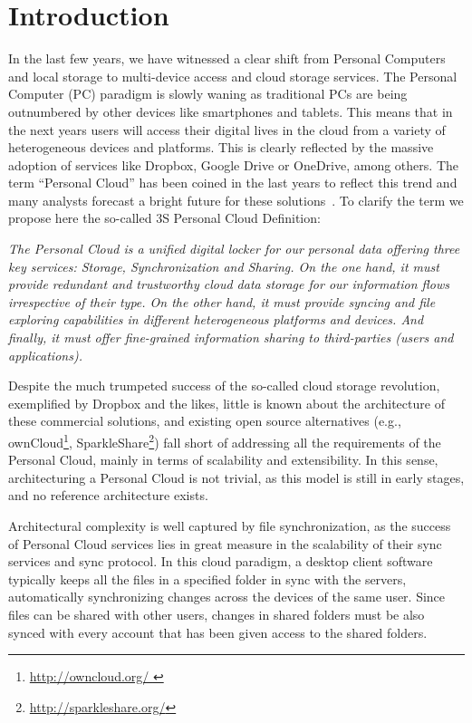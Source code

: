 \chapter{Introduction}

In the last few years, we have witnessed a clear shift from Personal Computers and local storage to multi-device access and cloud storage services. The Personal Computer (PC) paradigm is slowly waning as traditional PCs are being outnumbered by other devices like smartphones and tablets. This means that in the next years  users will access their digital lives in the cloud from a variety of heterogeneous devices and platforms. This is clearly reflected by the massive adoption of services like Dropbox, Google Drive or OneDrive, among others.  The term ``Personal Cloud'' has been coined in the last years to reflect this trend and many analysts forecast  a bright future for these solutions~\cite{forrester}\cite{gartner}. To clarify the term we propose here the so-called 3S Personal Cloud Definition:

\textit{The Personal Cloud is a unified digital  locker for our personal data offering three key services: Storage, Synchronization and Sharing.  On the one hand, it must provide redundant and trustworthy cloud data storage for our information flows irrespective of their type. On the other hand, it must provide syncing and file exploring capabilities in different heterogeneous platforms and devices. And finally, it must offer fine-grained information sharing to third-parties (users and applications).}

Despite the much trumpeted success of the so-called cloud storage revolution, exemplified by Dropbox and the 
likes, little is known about the architecture of these commercial solutions, and existing open source alternatives 
(e.g., ownCloud\footnote{\url{ http://owncloud.org/ }}, SparkleShare\footnote{\url{ http://sparkleshare.org/}})
fall short of addressing all the requirements of the Personal Cloud, mainly in terms of scalability and extensibility. 
In this sense, architecturing a Personal Cloud is not trivial, as this model is still in early stages, and no reference architecture exists.

Architectural complexity is well captured by file synchronization, as the success of Personal Cloud services
lies in great measure in the scalability of their sync services and sync protocol. In this cloud paradigm, a desktop client
software typically keeps all the files in a specified folder in sync with the servers, automatically synchronizing changes across the devices of the same user. Since files can be shared with other users, changes in
shared folders must be also synced with every account that has been given access to the shared folders.

